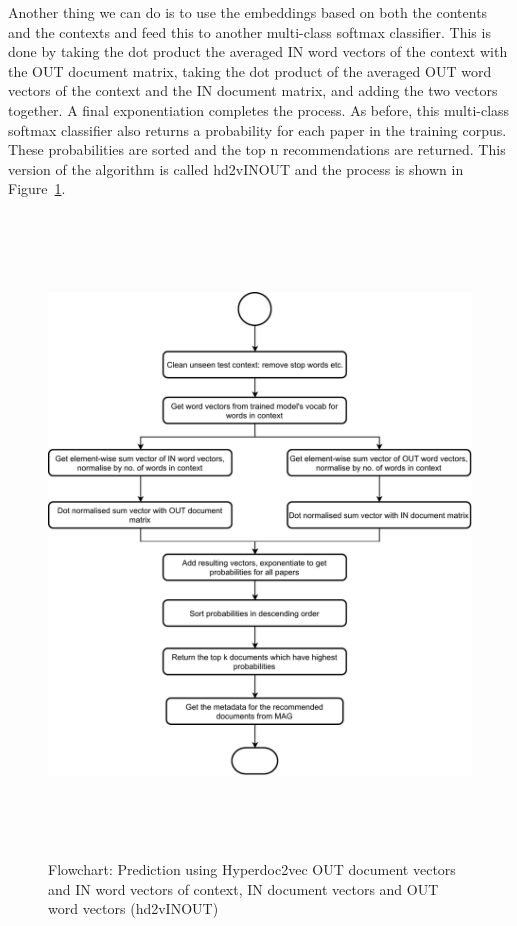 Another thing we can do is to use the embeddings based on both the contents and the contexts and feed this to another multi-class softmax classifier. This is done by taking the dot product the averaged IN word vectors of the context with the OUT document matrix, taking the dot product of the averaged OUT word vectors of the context and the IN document matrix, and adding the two vectors together. A final exponentiation completes the process.
As before, this multi-class softmax classifier also returns a probability for each paper in the training corpus. These probabilities are sorted and the top n recommendations are returned. This version of the algorithm is called hd2vINOUT and the process is shown in Figure~\ref{fig:hd2vINOUT}.
\begin{figure}
\centering
 \includegraphics[width=15cm,height=17cm]{figures/Approach/hd2vINOUT.pdf}
  \caption{Flowchart: Prediction using Hyperdoc2vec OUT document vectors and IN word vectors of context, IN document vectors and OUT word vectors (hd2vINOUT)}
  \label{fig:hd2vINOUT}
\end{figure}

